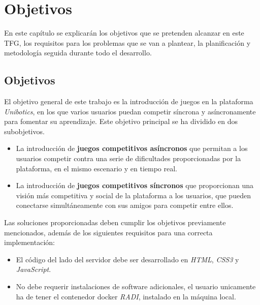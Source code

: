 \documentclass[a4paper, 12pt]{book}
\begin{document}
\cleardoublepage %
\chapter{Objetivos} %
\label{chap:objetivos} %

En este capítulo se explicarán los objetivos que se pretenden alcanzar en este TFG, los requisitos para los problemas que se van a plantear, la planificación y metodología seguida durante todo el desarrollo.

\section{Objetivos} %
\label{sec:objetivo-general} %

El objetivo general de este trabajo es la introducción de juegos en la plataforma \emph{Unibotics}, en los que varios usuarios puedan competir síncrona y asíncronamente para fomentar su aprendizaje. Este objetivo principal se ha dividido en dos subobjetivos.

\begin{itemize}
\item La introducción de \textbf{juegos competitivos asíncronos} que permitan a los usuarios competir contra una serie de dificultades proporcionadas por la plataforma, en el mismo escenario y en tiempo real.
\item La introducción de \textbf{juegos competitivos síncronos} que proporcionan una visión más competitiva y social de la plataforma a los usuarios, que pueden conectarse simultáneamente con sus amigos para competir entre ellos.
\end{itemize}

Las soluciones proporcionadas deben cumplir los objetivos previamente mencionados, además de los siguientes requisitos para una correcta implementación:

\begin{itemize}
\item El código del lado del servidor debe ser desarrollado en \emph{HTML}, \emph{CSS3} y \emph{JavaScript}.
\item No debe requerir instalaciones de software adicionales, el usuario unicamente ha de tener el contenedor docker \emph{RADI}, instalado en la máquina local.
\end{itemize}
\end{document}
